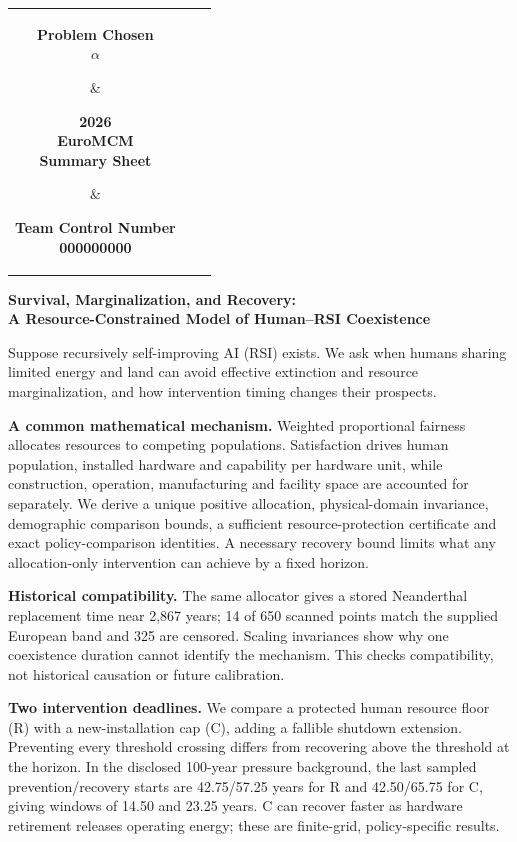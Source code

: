 \documentclass[12pt,a4paper]{article}
\theoremstyle{remark}
\newcommand{\TeamNumber}{000000000} %
\newcommand{\PaperTitle}{Survival, Marginalization, and Recovery:\\A Resource-Constrained Model of Human--RSI Coexistence}
\begin{document}
\thispagestyle{empty}
\vspace*{-5ex}
\begin{center}
\begin{tabular}{ccc}
\parbox[t]{0.29\linewidth}{\centering\bfseries Problem Chosen\\[3pt]\Large\textcolor{EuroBlue}{$\alpha$}} &
\parbox[t]{0.29\linewidth}{\centering\bfseries 2026\\EuroMCM\\Summary Sheet} &
\parbox[t]{0.29\linewidth}{\centering\bfseries Team Control Number\\[3pt]\Large\textcolor{EuroBlue}{\TeamNumber}}\\[6pt]
\hline
\end{tabular}
\end{center}
\begin{center}{\large\bfseries \PaperTitle}\end{center}
Suppose recursively self-improving AI (RSI) exists. We ask when humans sharing limited energy and land can avoid effective extinction and resource marginalization, and how intervention timing changes their prospects.

\textbf{A common mathematical mechanism.} Weighted proportional fairness allocates resources to competing populations. Satisfaction drives human population, installed hardware and capability per hardware unit, while construction, operation, manufacturing and facility space are accounted for separately. We derive a unique positive allocation, physical-domain invariance, demographic comparison bounds, a sufficient resource-protection certificate and exact policy-comparison identities. A necessary recovery bound limits what any allocation-only intervention can achieve by a fixed horizon.

\textbf{Historical compatibility.} The same allocator gives a stored Neanderthal replacement time near 2,867 years; 14 of 650 scanned points match the supplied European band and 325 are censored. Scaling invariances show why one coexistence duration cannot identify the mechanism. This checks compatibility, not historical causation or future calibration.

\textbf{Two intervention deadlines.} We compare a protected human resource floor (R) with a new-installation cap (C), adding a fallible shutdown extension. Preventing every threshold crossing differs from recovering above the threshold at the horizon. In the disclosed 100-year pressure background, the last sampled prevention/recovery starts are 42.75/57.25 years for R and 42.50/65.75 for C, giving windows of 14.50 and 23.25 years. C can recover faster as hardware retirement releases operating energy; these are finite-grid, policy-specific results.
\end{document}
